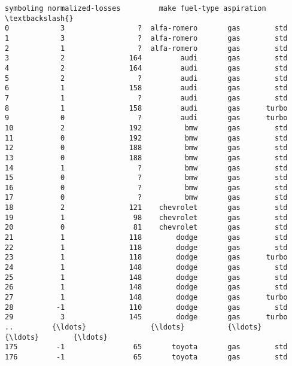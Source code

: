 \documentclass[11pt]{article}
\newcommand{\prompt}[4]{
        \llap{{\color{#2}[#3]: #4}}\vspace{-1.25em}
    }
\begin{document}
            \begin{tcolorbox}[breakable, boxrule=.5pt, size=fbox, pad at break*=1mm, opacityfill=0]
\prompt{Out}{outcolor}{8}{\hspace{3.5pt}}
\begin{Verbatim}[commandchars=\\\{\}]
     symboling normalized-losses         make fuel-type aspiration  \textbackslash{}
0            3                 ?  alfa-romero       gas        std
1            3                 ?  alfa-romero       gas        std
2            1                 ?  alfa-romero       gas        std
3            2               164         audi       gas        std
4            2               164         audi       gas        std
5            2                 ?         audi       gas        std
6            1               158         audi       gas        std
7            1                 ?         audi       gas        std
8            1               158         audi       gas      turbo
9            0                 ?         audi       gas      turbo
10           2               192          bmw       gas        std
11           0               192          bmw       gas        std
12           0               188          bmw       gas        std
13           0               188          bmw       gas        std
14           1                 ?          bmw       gas        std
15           0                 ?          bmw       gas        std
16           0                 ?          bmw       gas        std
17           0                 ?          bmw       gas        std
18           2               121    chevrolet       gas        std
19           1                98    chevrolet       gas        std
20           0                81    chevrolet       gas        std
21           1               118        dodge       gas        std
22           1               118        dodge       gas        std
23           1               118        dodge       gas      turbo
24           1               148        dodge       gas        std
25           1               148        dodge       gas        std
26           1               148        dodge       gas        std
27           1               148        dodge       gas      turbo
28          -1               110        dodge       gas        std
29           3               145        dodge       gas      turbo
..         {\ldots}               {\ldots}          {\ldots}       {\ldots}        {\ldots}
175         -1                65       toyota       gas        std
176         -1                65       toyota       gas        std

\end{Verbatim}
\end{tcolorbox}
\end{document}
